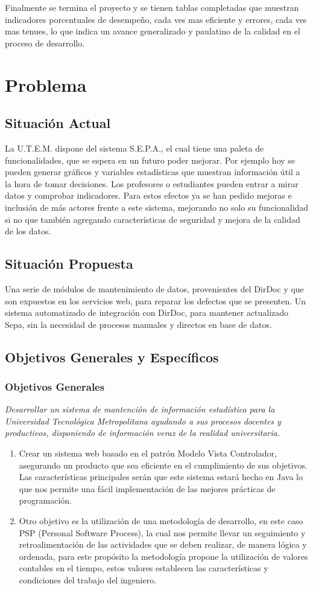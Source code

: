 \documentclass[a4paper,12pt,openany,oneside]{book}
\begin{document}
Finalmente se termina el proyecto y se tienen tablas completadas que muestran indicadores porcentuales de desempeño, cada ves mas eficiente y errores, cada ves mas tenues, lo que indica un avance generalizado y paulatino de la calidad en el proceso de desarrollo.
\chapter{Problema}
\thispagestyle{empty}
\section{Situación Actual}
La U.T.E.M. dispone del sistema S.E.P.A., el cual tiene una paleta de funcionalidades, que se espera en un futuro poder mejorar. Por ejemplo hoy se pueden generar gráficos y variables estadísticas que muestran información útil a la hora de tomar decisiones. Los profesores o estudiantes pueden entrar a mirar datos y comprobar indicadores. Para estos efectos ya se han pedido mejoras e inclusión de más actores frente a este sistema, mejorando no solo su funcionalidad si no que también agregando características de seguridad y mejora de la calidad de los datos.
\section{Situación Propuesta}
Una serie de módulos de mantenimiento de datos, provenientes del DirDoc y que son expuestos en los servicios web, para reparar los defectos que se presenten. Un sistema automatizado de integración con DirDoc,  para mantener actualizado Sepa, sin la necesidad de procesos manuales y directos en base de datos.
\section{Objetivos Generales y Específicos}
\subsection{Objetivos Generales}
\textit{Desarrollar un sistema de mantención de información estadística para la Universidad Tecnológica Metropolitana ayudando a sus procesos docentes y productivos, disponiendo de información veraz de la realidad universitaria.}
\begin{enumerate}
\item Crear un sistema web basado en el patrón Modelo Vista Controlador, asegurando un producto que sea eficiente en el cumplimiento de sus objetivos. Las características principales serán que este sistema estará hecho en Java lo que nos permite una fácil implementación de las mejores prácticas de programación.
\item Otro objetivo es la utilización de una metodología de desarrollo, en este caso PSP (Personal Software Process), la cual nos permite llevar un seguimiento y retroalimentación de las actividades que se deben realizar, de manera lógica y ordenada, para este propósito la metodología propone la utilización de valores contables en el tiempo, estos valores establecen las características y condiciones del trabajo del ingeniero.
\end{enumerate}
\end{document}
